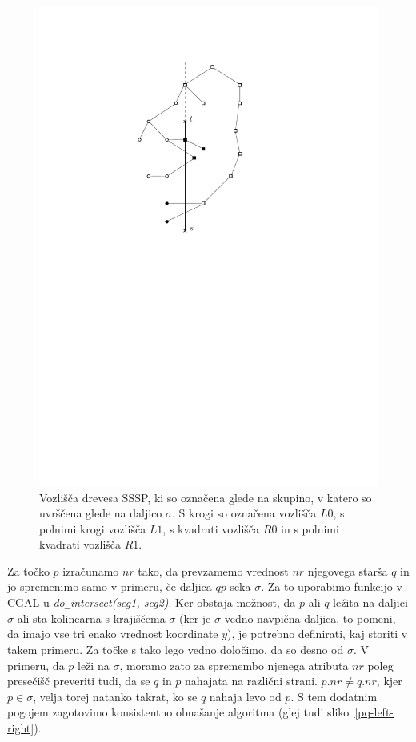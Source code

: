 \documentclass[a4paper, 12pt]{book}
\newcommand{\U}{\texttt{\_}}
\begin{document}
\begin{figure}[htp]
\centerline{\includegraphics{pics/categorization.pdf}}
\caption{Vozlišča drevesa SSSP, ki so označena glede na skupino, v katero so uvrščena glede na daljico $\sigma$. S krogi so označena vozlišča $L0$, s polnimi krogi vozlišča $L1$, s kvadrati vozlišča $R0$ in s polnimi kvadrati vozlišča $R1$. }
\label{categorization}
\end{figure}

Za točko $p$ izračunamo $nr$ tako, da prevzamemo vrednost $nr$ njegovega starša $q$ in jo spremenimo samo v primeru, če daljica $qp$ seka $\sigma$. Za to uporabimo funkcijo v CGAL-u \textit{do\U intersect(seg1, seg2)}. Ker obstaja možnost, da $p$ ali $q$ ležita na daljici $\sigma$ ali sta kolinearna s krajiščema $\sigma$ (ker je $\sigma$ vedno navpična daljica, to pomeni, da imajo vse tri enako vrednost koordinate $y$), je potrebno definirati, kaj storiti v takem primeru. Za točke s tako lego vedno določimo, da so desno od $\sigma$.  V primeru, da $p$ leži na $\sigma$, moramo zato za spremembo njenega atributa $nr$ poleg presečišč preveriti tudi, da se $q$ in $p$ nahajata na različni strani. $p.nr\neq q.nr$, kjer $p\in \sigma$, velja torej natanko takrat, ko se $q$ nahaja levo od $p$. S tem dodatnim pogojem zagotovimo konsistentno obnašanje algoritma (glej tudi sliko~\ref{pq-left-right}).
\end{document}
